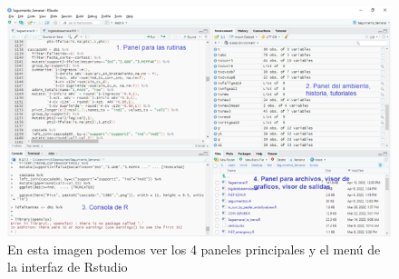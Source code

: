 \documentclass[
  letterpaper,
  DIV=11,
  numbers=noendperiod]{scrreprt}
\begin{document}
\begin{figure}[H]

{\centering \includegraphics[width=6.6875in,height=\textheight,keepaspectratio]{imagenes/01interfazrstudio.png}

}

\caption{En esta imagen podemos ver los 4 paneles principales y el menú
de la interfaz de Rstudio}

\end{figure}%
\end{document}
